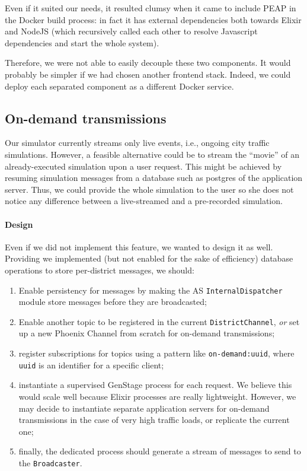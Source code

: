 Even if it suited our needs, it resulted clumsy when it came to include PEAP
in the Docker build process: in fact it has external dependencies both towards
Elixir and NodeJS (which recursively called each other to resolve
Javascript dependencies and start the whole system).

Therefore, we were not able to easily decouple these two components.
It would probably be simpler if we had chosen another
frontend stack. Indeed, we could 
deploy each separated component as a different Docker service.

\subsection{On-demand transmissions}
Our simulator currently streams only live events, i.e., ongoing city traffic
simulations. However, a feasible alternative could be to stream the ``movie''
of an already-executed simulation upon a user request.
This might be achieved by resuming simulation messages from a database such as
postgres of the application server. Thus, we could provide the
whole simulation to the user so she does not notice any difference between
a live-streamed and a pre-recorded simulation.


\paragraph{Design}
Even if we did not implement this feature, we wanted to design it as well.
Providing we implemented (but not enabled for the sake of efficiency) database
operations to store per-district messages, we should:

\begin{enumerate}
  \item Enable persistency for messages by making the AS
    \texttt{InternalDispatcher} module store messages before they are
    broadcasted;
  \item Enable another topic to be registered in the current
    \texttt{DistrictChannel}, \textit{or} set up a new Phoenix Channel from
    scratch for on-demand transmissions;
  \item register subscriptions for topics using a pattern like
    \texttt{on-demand:uuid}, where \texttt{uuid} is an identifier for a
    specific client;
  \item instantiate a supervised GenStage process for each request. We believe
    this would scale well because Elixir processes are really lightweight.
    However, we may decide to instantiate separate application servers for
    on-demand transmissions in the case of very high traffic loads, or
    replicate the current one;
  \item finally, the dedicated process should generate a stream of messages to
    send to the \texttt{Broadcaster}.
\end{enumerate}

